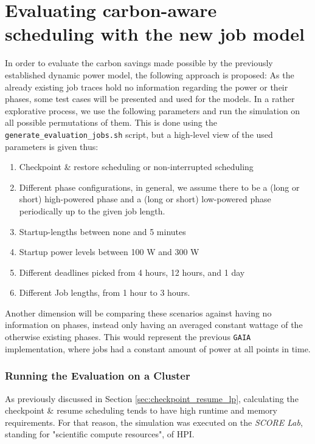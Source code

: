 \chapter{Evaluating carbon-aware scheduling with the new job model} \label{sec:evaluate_scheduling}

In order to evaluate the carbon savings made possible by the previously established dynamic power model, the following approach is proposed:
As the already existing job traces hold no information regarding the power or their phases, some test cases will be presented and used for the models.
In a rather explorative process, we use the following parameters and run the simulation on all possible permutations of them. 
This is done using the \verb|generate_evaluation_jobs.sh| script, but a high-level view of the used parameters is given thus:

\begin{enumerate}
    \item Checkpoint \& restore scheduling or non-interrupted scheduling
    \item Different phase configurations, in general, we assume there to be a (long or short) high-powered phase and a (long or short) low-powered phase periodically up to the given job length. 
    \item Startup-lengths between none and 5 minutes
    \item Startup power levels between 100 W and 300 W
    \item Different deadlines picked from 4 hours, 12 hours, and 1 day
    \item Different Job lengths, from 1 hour to 3 hours. \label{eval_list:lengths}
\end{enumerate}

Another dimension will be comparing these scenarios against having no information on phases, instead only having an averaged constant wattage of the otherwise existing phases.
This would represent the previous \verb|GAIA| implementation, where jobs had a constant amount of power at all points in time. 

\subsection{Running the Evaluation on a Cluster}

As previously discussed in Section \ref{sec:checkpoint_resume_lp}, calculating the checkpoint \& resume scheduling tends to have high runtime and memory requirements. 
For that reason, the simulation was executed on the \emph{SCORE Lab}, standing for "scientific compute resources", of HPI.

